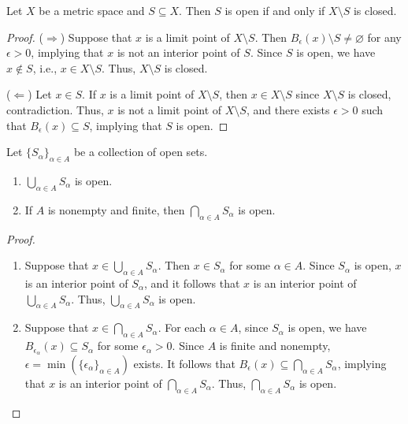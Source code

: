 \begin{theorem}
  Let $X$ be a metric space and $S \subseteq X$.
  Then $S$ is open if and only if $X \setminus S$ is closed.
\end{theorem}
\begin{proof}
  ($\Rightarrow$)
  Suppose that $x$ is a limit point of $X \setminus S$.
  Then $B_\epsilon(x) \setminus S \neq \varnothing$ for any $\epsilon > 0$,
  implying that $x$ is not an interior point of $S$.
  Since $S$ is open, we have $x \notin S$, i.e., $x \in X \setminus S$.
  Thus, $X \setminus S$ is closed.

  ($\Leftarrow$)
  Let $x \in S$.
  If $x$ is a limit point of $X \setminus S$, then $x \in X \setminus S$ since
  $X \setminus S$ is closed, contradiction.
  Thus, $x$ is not a limit point of $X \setminus S$, and there exists
  $\epsilon > 0$ such that $B_\epsilon(x) \subseteq S$, implying that $S$ is
  open.
\end{proof}

\begin{theorem}
  Let $\{S_\alpha\}_{\alpha \in A}$ be a collection of open sets.
  \begin{enumerate}
    \item $\bigcup_{\alpha \in A} S_\alpha$ is open.
    \item If $A$ is nonempty and finite, then $\bigcap_{\alpha \in A} S_\alpha$
    is open.
  \end{enumerate}
\end{theorem}
\begin{proof}
  \leavevmode
  \begin{enumerate}
    \item Suppose that $x \in \bigcup_{\alpha \in A} S_\alpha$.
    Then $x \in S_\alpha$ for some $\alpha \in A$.
    Since $S_\alpha$ is open, $x$ is an interior point of $S_\alpha$, and it
    follows that $x$ is an interior point of $\bigcup_{\alpha \in A} S_\alpha$.
    Thus, $\bigcup_{\alpha \in A} S_\alpha$ is open.
    \item Suppose that $x \in \bigcap_{\alpha \in A} S_\alpha$.
    For each $\alpha \in A$, since $S_\alpha$ is open, we have
    $B_{\epsilon_\alpha}(x) \subseteq S_\alpha$ for some $\epsilon_\alpha > 0$.
    Since $A$ is finite and nonempty,
    $\epsilon = \min(\{\epsilon_\alpha\}_{\alpha \in A})$ exists.
    It follows that $B_\epsilon(x) \subseteq \bigcap_{\alpha \in A} S_\alpha$,
    implying that $x$ is an interior point of $\bigcap_{\alpha \in A}
    S_\alpha$.
    Thus, $\bigcap_{\alpha \in A} S_\alpha$ is open.
    \qedhere
  \end{enumerate}
\end{proof}

